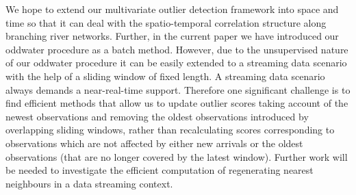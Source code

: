 \documentclass[draft]{agujournal2018} %
\begin{document}
We hope to extend our multivariate outlier detection framework into space and time
so that it can deal with the spatio-temporal correlation structure along
branching river networks. \color{black} Further, in the current paper we have introduced our oddwater procedure as a batch method. However, due to the unsupervised nature of our oddwater procedure it can be easily extended to a streaming data scenario with the help of a sliding window of fixed length. A streaming data scenario always demands a near-real-time support. Therefore one significant challenge is to find efficient  methods  that allow us to update  outlier scores taking account of the newest observations and removing the oldest observations introduced by overlapping sliding windows, rather than recalculating scores corresponding to observations which are not affected by either  new arrivals or the oldest observations (that are  no longer covered by the latest window). Further work will be needed to investigate the  efficient computation of regenerating nearest neighbours in a data streaming context. \color{black}




%
%
%
%
%
%
%
%
\end{document}
